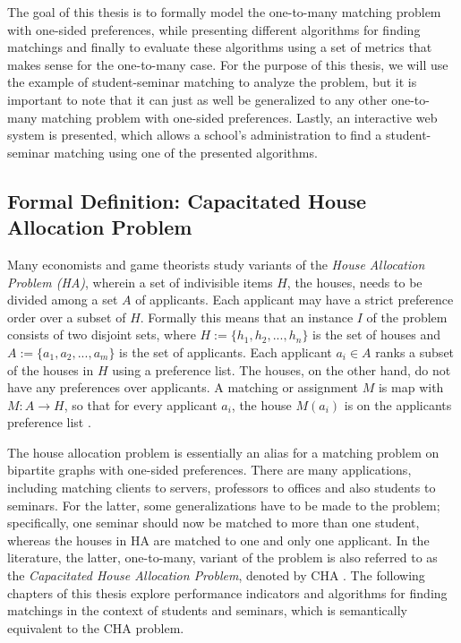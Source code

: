 The goal of this thesis is to formally model the one-to-many matching problem with one-sided preferences, while presenting different algorithms for finding matchings and finally to evaluate these algorithms using a set of metrics that makes sense for the one-to-many case. For the purpose of this thesis, we will use the example of student-seminar matching to analyze the problem, but it is important to note that it can just as well be generalized to any other one-to-many matching problem with one-sided preferences. Lastly, an interactive web system is presented, which allows a school's administration to find a student-seminar matching using one of the presented algorithms. 

\subsection{Formal Definition: Capacitated House Allocation Problem}\label{intro:cha}
Many economists and game theorists \cite{FEKETE2003219} study variants of the \emph{House Allocation Problem (HA)}, wherein a set of indivisible items $H$, the houses, needs to be divided among a set $A$ of applicants. Each applicant may have a strict preference order over a subset of $H$. Formally this means that an instance $I$ of the problem consists of two disjoint sets, where $H := \{h_1, h_2, ..., h_n\}$ is the set of houses and $A := \{a_1, a_2, ..., a_m\}$ is the set of applicants. Each applicant $a_i \in A$ ranks a subset of the houses in $H$ using a preference list. The houses, on the other hand, do not have any preferences over applicants. A matching or assignment $M$ is map with $M: A \rightarrow H$, so that for every applicant $a_i$, the house $M(a_i)$ is on the applicants preference list \cite{SngThesis}. 

The house allocation problem is essentially an alias for a matching problem on bipartite graphs with one-sided preferences. There are many applications, including matching clients to servers, professors to offices and also students to seminars. For the latter, some generalizations have to be made to the problem; specifically, one seminar should now be matched to more than one student, whereas the houses in HA are matched to one and only one applicant. In the literature, the latter, one-to-many, variant of the problem is also referred to as the \emph{Capacitated House Allocation Problem}, denoted by CHA \cite{algorithmics}. The following chapters of this thesis explore performance indicators and algorithms for finding matchings in the context of students and seminars, which is semantically equivalent to the CHA problem.

